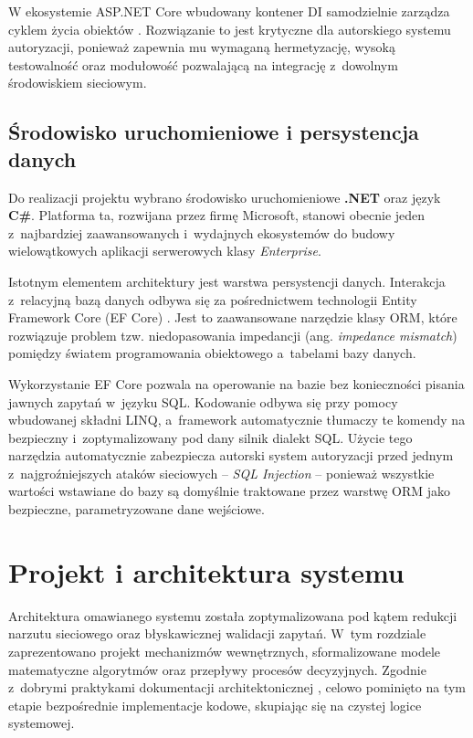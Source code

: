 \documentclass{SGGW-thesis}
\begin{document}
W ekosystemie ASP.NET Core wbudowany kontener DI samodzielnie zarządza cyklem życia obiektów \cite{proaspnet}. Rozwiązanie to jest krytyczne dla autorskiego systemu autoryzacji, ponieważ zapewnia mu wymaganą hermetyzację, wysoką testowalność oraz modułowość pozwalającą na integrację z~dowolnym środowiskiem sieciowym.

\section{Środowisko uruchomieniowe i persystencja danych}

Do realizacji projektu wybrano środowisko uruchomieniowe \textbf{.NET} oraz język \textbf{C\#}. Platforma ta, rozwijana przez firmę Microsoft, stanowi obecnie jeden z~najbardziej zaawansowanych i~wydajnych ekosystemów do budowy wielowątkowych aplikacji serwerowych klasy \textit{Enterprise}.

Istotnym elementem architektury jest warstwa persystencji danych. Interakcja z~relacyjną bazą danych odbywa się za pośrednictwem technologii Entity Framework Core (EF Core) \cite{ms_ef}. Jest to zaawansowane narzędzie klasy ORM, które rozwiązuje problem tzw. niedopasowania impedancji (ang. \textit{impedance mismatch}) pomiędzy światem programowania obiektowego a~tabelami bazy danych.

Wykorzystanie EF Core pozwala na operowanie na bazie bez konieczności pisania jawnych zapytań w~języku SQL. Kodowanie odbywa się przy pomocy wbudowanej składni LINQ, a~framework automatycznie tłumaczy te komendy na bezpieczny i~zoptymalizowany pod dany silnik dialekt SQL. Użycie tego narzędzia automatycznie zabezpiecza autorski system autoryzacji przed jednym z~najgroźniejszych ataków sieciowych – \textit{SQL Injection} – ponieważ wszystkie wartości wstawiane do bazy są domyślnie traktowane przez warstwę ORM jako bezpieczne, parametryzowane dane wejściowe.

\startchapterfromoddpage
\chapter{Projekt i architektura systemu}

Architektura omawianego systemu została zoptymalizowana pod kątem redukcji narzutu sieciowego oraz błyskawicznej walidacji zapytań. W~tym rozdziale zaprezentowano projekt mechanizmów wewnętrznych, sformalizowane modele matematyczne algorytmów oraz przepływy procesów decyzyjnych. Zgodnie z~dobrymi praktykami dokumentacji architektonicznej \cite{ddd}, celowo pominięto na tym etapie bezpośrednie implementacje kodowe, skupiając się na czystej logice systemowej.
\end{document}
